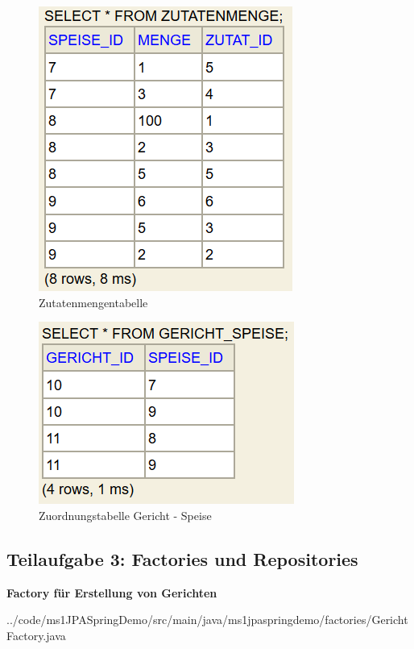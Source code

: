 \begin{figure}[H]
\centering
\includegraphics{ms1/screenshots/zutatenmenge_tbl.PNG}
\caption{Zutatenmengentabelle}
\end{figure}

\begin{figure}[H]
\centering
\includegraphics{ms1/screenshots/gericht_speise_tbl.PNG}
\caption{Zuordnungstabelle Gericht - Speise}
\end{figure}

\subsection{Teilaufgabe 3: Factories und Repositories}

\begin{mdframed}[style=codebox]
\textbf{Factory für Erstellung von Gerichten}

{../code/ms1JPASpringDemo/src/main/java/ms1jpaspringdemo/factories/GerichtFactory.java}
\end{mdframed}

